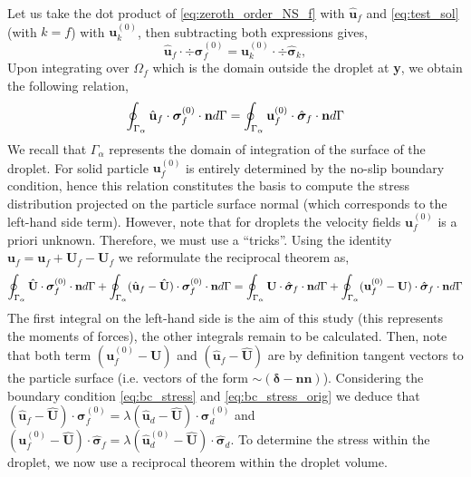Let us take the dot product of \ref{eq:zeroth_order_NS_f} with $\hat{\textbf{u}}_f$ and \ref{eq:test_sol} (with $k = f$) with $\textbf{u}_k^{(0)}$, then subtracting both expressions gives, 
\begin{equation*}
    \hat{\textbf{u}}_f\cdot \div\bm\sigma_f^{(0)}
    =
    \textbf{u}_k^{(0)} \cdot \div \hat{\bm\sigma}_k, 
\end{equation*}
Upon integrating over $\Omega_f$ which is the domain outside the droplet at \textbf{y},  we obtain the following relation, 
\begin{equation*}
    \oint_{\Gamma_{\alpha}} \hat{\textbf{u}}_f\cdot  \bm\sigma_f^{(0)} \cdot \textbf{n} d\Gamma
    = 
    \oint_{\Gamma_{\alpha}} \textbf{u}_f^{(0)}\cdot  \hat{\bm\sigma}_f \cdot \textbf{n} d\Gamma
\end{equation*}
We recall that $\Gamma_\alpha$ represents the domain of integration of the surface of the droplet. 
For solid particle $\textbf{u}_f^{(0)}$ is entirely determined by the no-slip boundary condition, hence this relation constitutes the basis to compute the stress distribution projected on the particle surface normal (which corresponds to the left-hand side term). 
However, note that for droplets the velocity fields $\textbf{u}_f^{(0)}$ is a priori unknown.
Therefore, we must use a ``tricks''. 
Using the identity $\textbf{u}_f = \textbf{u}_f +\textbf{U}_f-\textbf{U}_f$ we reformulate the reciprocal theorem as, 
\begin{equation}
    \intS{\hat{\textbf{U}}\cdot  \bm\sigma_f^{(0)} \cdot \textbf{n}}
    + \intS{(\hat{\textbf{u}}_f - \hat{\textbf{U}})\cdot  \bm\sigma_f^{(0)} \cdot \textbf{n}}
    = 
    \intS{\textbf{U}\cdot  \hat{\bm\sigma}_f \cdot \textbf{n}}
    + \intS{(\textbf{u}_f^{(0)} - \textbf{U})\cdot  \hat{\bm\sigma}_f \cdot \textbf{n}}
    \label{eq:reciprocal_f}
\end{equation}
The first integral on the left-hand side is the aim of this study (this represents the moments of forces), the other integrals remain to be calculated. 
Then, note that both term $(\textbf{u}_f^{(0)} - \textbf{U})$ and $(\hat{\textbf{u}}_f - \hat{\textbf{U}})$ are by definition tangent vectors to the particle surface (i.e. vectors of the form $\sim (\bm\delta - \textbf{nn})$). 
Considering the boundary condition \ref{eq:bc_stress} and \ref{eq:bc_stress_orig} we deduce that $(\hat{\textbf{u}}_f - \hat{\textbf{U}})\cdot  \bm\sigma_f^{(0)} = \lambda (\hat{\textbf{u}}_d - \hat{\textbf{U}})\cdot  \bm\sigma_d^{(0)}$ and  $({\textbf{u}}_f^{(0)} - \hat{\textbf{U}})\cdot  \hat{\bm\sigma}_f = \lambda (\hat{\textbf{u}}_d^{(0)} - \hat{\textbf{U}})\cdot  \hat{\bm\sigma}_d$. 
To determine the stress within the droplet, we now use a reciprocal theorem within the droplet volume. 

